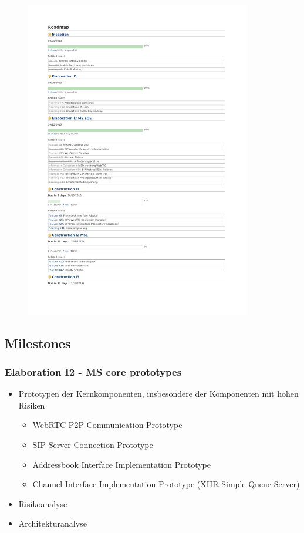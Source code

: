 	\begin{figure}[H]
		\includegraphics[trim=1.75cm 2cm 2cm 2.5cm, clip=true,page=2,width=0.88\textwidth]{../projektplan/media/roadmap.pdf}
	\end{figure}
	
	\subsection{Milestones}
		\subsubsection{Elaboration I2 - MS core prototypes}
			\begin{itemize}
				\item Prototypen der Kernkomponenten, insbesondere der Komponenten mit hohen Risiken
					\begin{itemize}
						\item WebRTC P2P Communication Prototype
						\item SIP Server Connection Prototype
						\item Addressbook Interface Implementation Prototype
						\item Channel Interface Implementation Prototype (XHR Simple Queue Server)
					\end{itemize}
				\item Risikoanalyse
				\item Architekturanalyse
			\end{itemize}
			
